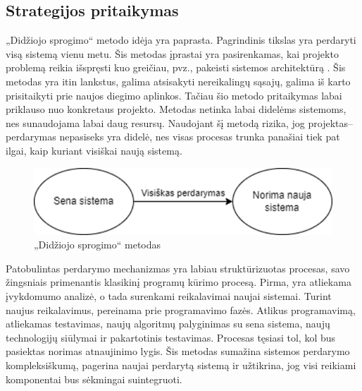 \documentclass[fleqn]{VUMIFPSkursinis}
\begin{document}
\subsection{Strategijos pritaikymas}
„Didžiojo sprogimo“ metodo idėja yra paprasta. Pagrindinis tikslas yra perdaryti visą sistemą vienu metu. Šis metodas įprastai yra pasirenkamas, kai projekto problemą reikia išspręsti kuo greičiau, pvz., pakeisti sistemos architektūrą \cite{Ngu11}. Šis metodas yra itin lankstus, galima atsisakyti nereikalingų sąsajų, galima iš karto prisitaikyti prie naujos diegimo aplinkos. Tačiau šio metodo pritaikymas labai priklauso nuo konkretaus projekto. Metodas netinka labai didelėms sistemoms, nes sunaudojama labai daug resursų. Naudojant šį metodą rizika, jog projektas–perdarymas nepasiseks yra didelė, nes visas procesas trunka panašiai tiek pat ilgai, kaip kuriant visiškai naują sistemą.
\begin{figure}[H]
    \centering
    \includegraphics{img/didziojo-sprogimo-metodas.png}
    \caption{„Didžiojo sprogimo“ metodas}
    \label{img:didziojo-sprogimo-metodas}
\end{figure}

Patobulintas perdarymo mechanizmas yra labiau struktūrizuotas procesas, savo žingsniais primenantis klasikinį programų kūrimo procesą. Pirma, yra atliekama įvykdomumo analizė, o tada surenkami reikalavimai naujai sistemai. Turint naujus reikalavimus, pereinama prie programavimo fazės. Atlikus programavimą, atliekamas testavimas, naujų algoritmų palyginimas su sena sistema, naujų technologijų siūlymai ir pakartotinis testavimas. Procesas tęsiasi tol, kol bus pasiektas norimas atnaujinimo lygis. Šis metodas sumažina sistemos perdarymo kompleksiškumą, pagerina naujai perdarytą sistemą ir užtikrina, jog visi reikiami komponentai bus sėkmingai suintegruoti.
\end{document}
